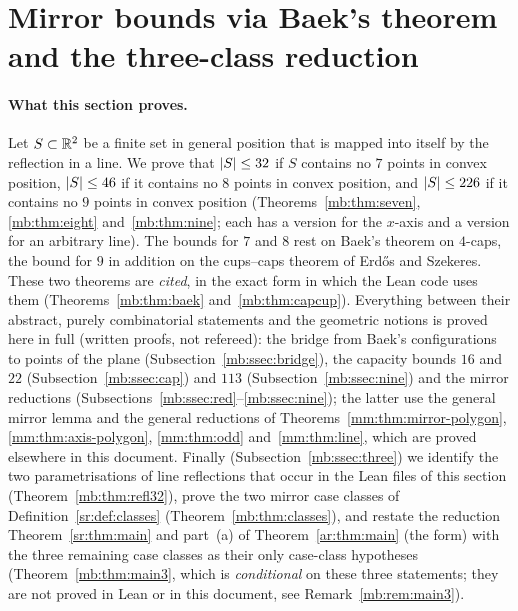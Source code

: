 \section{Mirror bounds via Baek's theorem and the three-class reduction}\label{mb:sec}

\paragraph{What this section proves.}
Let $S\subset\mathbb R^2$ be a finite set in general position that is mapped into itself by the reflection in a line. We prove
that $\lvert S\rvert\le 32$ if $S$ contains no $7$ points in convex position, $\lvert S\rvert\le 46$ if it contains no $8$ points in
convex position, and $\lvert S\rvert\le 226$ if it contains no $9$ points in convex position
(Theorems~\ref{mb:thm:seven}, \ref{mb:thm:eight} and~\ref{mb:thm:nine}; each has a version for the $x$-axis and a version
for an arbitrary line). The bounds for $7$ and $8$ rest on Baek's theorem on $4$-caps, the bound for $9$ in addition on
the cups--caps theorem of Erd\H{o}s and Szekeres. These two theorems are \emph{cited}, in the exact form in which the Lean
code uses them (Theorems~\ref{mb:thm:baek} and~\ref{mb:thm:capcup}). Everything between their abstract, purely
combinatorial statements and the geometric notions is proved here in full (written proofs, not refereed): the bridge
from Baek's configurations to points of the plane (Subsection~\ref{mb:ssec:bridge}), the capacity bounds $16$ and $22$
(Subsection~\ref{mb:ssec:cap}) and $113$ (Subsection~\ref{mb:ssec:nine}) and the mirror reductions
(Subsections~\ref{mb:ssec:red}--\ref{mb:ssec:nine}); the latter use the general mirror lemma
and the general reductions of Theorems~\ref{mm:thm:mirror-polygon}, \ref{mm:thm:axis-polygon}, \ref{mm:thm:odd}
and~\ref{mm:thm:line}, which are proved elsewhere in this document. Finally (Subsection~\ref{mb:ssec:three})
we identify the two parametrisations of line reflections that occur in the Lean files of this section
(Theorem~\ref{mb:thm:refl32}), prove the two mirror case classes of Definition~\ref{sr:def:classes}
(Theorem~\ref{mb:thm:classes}), and restate the reduction Theorem~\ref{sr:thm:main} and part~(a) of
Theorem~\ref{ar:thm:main} (the  form) with the three remaining case classes as their only case-class
hypotheses (Theorem~\ref{mb:thm:main3}, which is
\emph{conditional} on these three statements; they are not proved in Lean or in this document, see
Remark~\ref{mb:rem:main3}).

